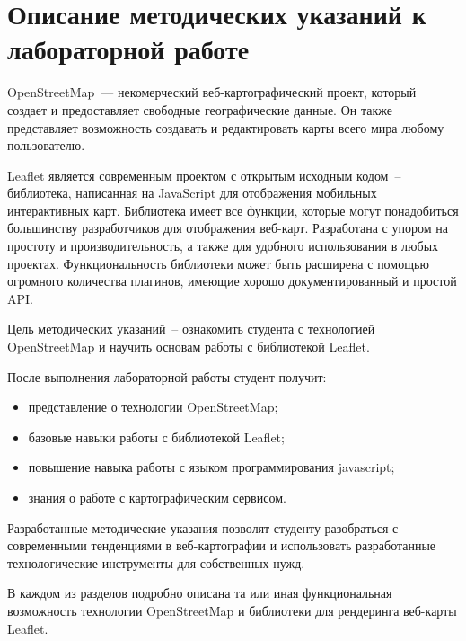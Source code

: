 \documentclass[a4paper, 14pt]{extreport}
\begin{document}
    \chapter{Описание методических указаний к лабораторной работе}
    OpenStreetMap~--- некомерческий веб-картографический проект, который
    создает и предоставляет свободные географические данные. Он также
    представляет возможность создавать и редактировать карты всего мира
    любому пользователю.

    Leaflet является современным проектом с открытым исходным кодом~--
    библиотека, написанная на JavaScript для отображения мобильных
    интерактивных карт. Библиотека имеет все функции, которые могут
    понадобиться большинству разработчиков для отображения веб-карт.
    Разработана с упором на простоту и производительность, а также для удобного
    использования в любых проектах. Функциональность библиотеки может быть
    расширена с помощью огромного количества плагинов, имеющие хорошо
    документированный и простой API.

    Цель методических указаний~-- ознакомить студента с технологией
    OpenStreetMap и научить основам работы с библиотекой Leaflet.

    После выполнения лабораторной работы студент получит:
    \begin{itemize}
        \item представление о технологии OpenStreetMap;
        \item базовые навыки работы с библиотекой Leaflet;
        \item повышение навыка работы с языком программирования javascript;
        \item знания о работе с картографическим сервисом.
    \end{itemize}
    
    Разработанные методические указания позволят студенту разобраться с
    современными тенденциями в веб-картографии и использовать разработанные
    технологические инструменты для собственных нужд.  

    В каждом из разделов подробно описана та или иная функциональная
    возможность технологии OpenStreetMap и библиотеки для рендеринга веб-карты
    Leaflet.
\end{document}
